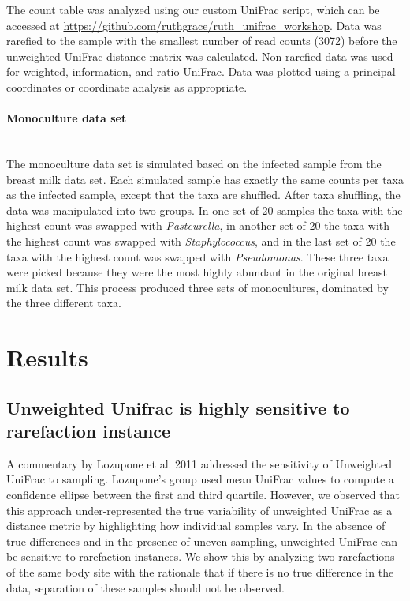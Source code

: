 \documentclass[10pt,letterpaper]{article}
\begin{document}
The count table was analyzed using our custom UniFrac script, which can be accessed at \url{https://github.com/ruthgrace/ruth_unifrac_workshop}. Data was rarefied to the sample with the smallest number of read counts (3072) before the unweighted UniFrac distance matrix was calculated. Non-rarefied data was used for weighted, information, and ratio UniFrac. Data was plotted using a principal coordinates or coordinate analysis as appropriate.

\paragraph{Monoculture data set}\mbox{}\\
The monoculture data set is simulated based on the infected sample from the breast milk data set. Each simulated sample has exactly the same counts per taxa as the infected sample, except that the taxa are shuffled. After taxa shuffling, the data was manipulated into two groups. In one set of 20 samples the taxa with the highest count was swapped with \textit{Pasteurella}, in another set of 20 the taxa with the highest count was swapped with \textit{Staphylococcus}, and in the last set of 20 the taxa with the highest count was swapped with \textit{Pseudomonas}. These three taxa were picked because they were the most highly abundant in the original breast milk data set. This process produced three sets of monocultures, dominated by the three different taxa.

\section*{Results}

\subsection{Unweighted Unifrac is highly sensitive to rarefaction instance}

A commentary by Lozupone et al. 2011 \cite{lozupone2011unifrac} addressed the sensitivity of Unweighted UniFrac to sampling. Lozupone's group used mean UniFrac values to compute a confidence ellipse between the first and third quartile. However, we observed that this approach under-represented the true variability of unweighted UniFrac as a distance metric by highlighting how individual samples vary. In the absence of true differences and in the presence of uneven sampling, unweighted UniFrac can be sensitive to rarefaction instances. We show this by analyzing two rarefactions of the same body site with the rationale that if there is no true difference in the data, separation of these samples should not be observed.
\end{document}
